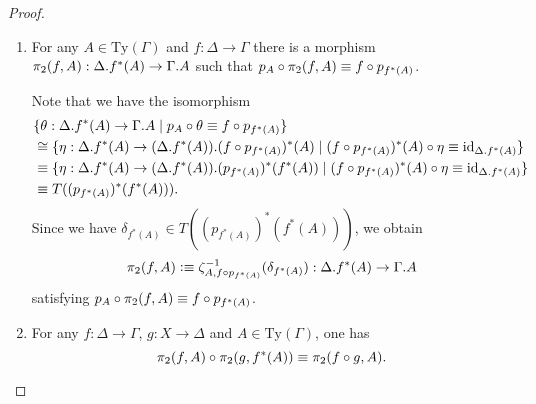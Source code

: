 \begin{proof}
\begin{enumerate}
\item For any $A\in\mathrm{Ty}(\Gamma)$ and $f:\Delta\to\Gamma$ 
there is a morphism $\pi_2(f,A):\ctxext{\Delta}{f^\ast(A)}\to\ctxext{\Gamma}{A}$
such that $p_A\circ \pi_2(f,A)\equiv f\circ p_{f^\ast(A)}$.

\medskip
Note that we have the isomorphism
\begin{align*}
& \{ \theta : \ctxext{\Delta}{f^\ast(A)}\to\ctxext{\Gamma}{A}\mid p_A\circ\theta\jdeq f\circ p_{f^\ast(A)} \} \\
  & \cong
\{ \eta : \ctxext{\Delta}{f^\ast(A)}\to\ctxext{{\Delta}{f^\ast(A)}}{(f\circ p_{f^\ast(A)})^\ast(A)}
  \mid (f\circ p_{f^\ast(A)})^\ast(A)\circ\eta\jdeq\catid{\ctxext{\Delta}{f^\ast(A)}}\} \\
  & \jdeq
\{ \eta : \ctxext{\Delta}{f^\ast(A)}\to\ctxext{{\Delta}{f^\ast(A)}}{(p_{f^\ast(A)})^\ast(f^\ast(A))}
  \mid (f\circ p_{f^\ast(A)})^\ast(A)\circ\eta\jdeq\catid{\ctxext{\Delta}{f^\ast(A)}}\} \\
  & \jdeq
T((p_{f^\ast(A)})^\ast(f^\ast(A))).
\end{align*}
Since we have $\delta_{f^\ast(A)}\in T((p_{f^\ast(A)})^\ast(f^\ast(A)))$, we obtain 
\begin{equation*}
\pi_2(f,A)\defeq \zeta_{A,f\circ p_{f^\ast(A)}}^{-1}(\delta_{f^\ast(A)}):\ctxext{\Delta}{f^\ast(A)}\to\ctxext{\Gamma}{A}
\end{equation*}
satisfying $p_A\circ\pi_2(f,A)\equiv f\circ p_{f^\ast(A)}$.
\item For any $f:\Delta\to\Gamma$, $g:X\to\Delta$ and $A\in\mathrm{Ty}(\Gamma)$, one has
\begin{equation*}
\pi_2(f,A)\circ\pi_2(g,f^\ast(A))\equiv\pi_2(f\circ g,A).
\end{equation*}


\end{enumerate}
\end{proof}

